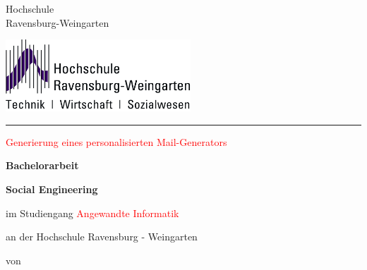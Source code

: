
\thispagestyle{empty}
{
\normalsize{} \fontsize{12pt}{10}\selectfont 
\vspace{-1cm}
\begin{minipage}[b]{9.4cm}
{\fontsize{13pt}{13} \selectfont%
Hochschule\\[1ex]
Ravensburg-Weingarten}\\[1ex]
\end{minipage}
}
\begin{minipage}[b]{10cm}
\includegraphics*[height=2.7cm]{bilder/HSLogoWGd}
\end{minipage}


\vspace{10mm}
 
\hrule 
\vspace{1cm}
{
 \fontsize{20pt}{20}  \selectfont%
\begin{center}
\textcolor{red}{Generierung eines personalisierten Mail-Generators} %
\end{center}
}

\begin{center}
\large \textbf{Bachelorarbeit} %
\end{center}

\begin{center}
\textbf{Social Engineering} %
\end{center}

\vspace{5mm}

\begin{center}
im Studiengang \textcolor{red}{Angewandte Informatik} %
\end{center}

\begin{center}
an der Hochschule Ravensburg - Weingarten 
\end{center}
\begin{center}

\end{center}
\vspace{5mm}
\begin{center}
von
\end{center}




